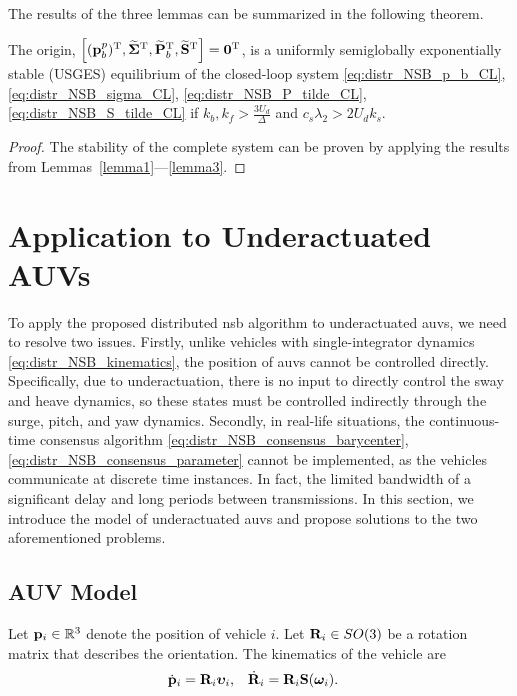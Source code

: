 The results of the three lemmas can be summarized in the following theorem.
\begin{theorem}
    \label{thm_distr_NSB}
    The origin, $\left[(\mathbf{p}_b^p)^{\mathrm{T}}, \widetilde{\bm{\Sigma}}^{\mathrm{T}}, \widetilde{\mathbf{P}}_b^{\mathrm{T}}, \widetilde{\mathbf{S}}^{\mathrm{T}}\right] = \mathbf{0}^{\mathrm{T}}$, is a uniformly semiglobally exponentially stable (USGES) equilibrium of the closed-loop system \eqref{eq:distr_NSB_p_b_CL}, \eqref{eq:distr_NSB_sigma_CL}, \eqref{eq:distr_NSB_P_tilde_CL}, \eqref{eq:distr_NSB_S_tilde_CL} if $k_b, k_f > \frac{3U_d}{\Delta}$ and $c_s \lambda_2 > 2 U_d k_s$.
\end{theorem}
\begin{proof}
    The stability of the complete system can be proven by applying the results from Lemmas~\ref{lemma1}---\ref{lemma3}.
\end{proof}

\section{Application to Underactuated AUVs}
\label{sec:distr_NSB_AUV}
To apply the proposed distributed \gls{nsb} algorithm to underactuated \glspl{auv}, we need to resolve two issues.
Firstly, unlike vehicles with single-integrator dynamics \eqref{eq:distr_NSB_kinematics}, the position of \glspl{auv} cannot be controlled directly.
Specifically, due to underactuation, there is no input to directly control the sway and heave dynamics, so these states must be controlled indirectly through the surge, pitch, and yaw dynamics.
Secondly, in real-life situations, the continuous-time consensus algorithm \eqref{eq:distr_NSB_consensus_barycenter}, \eqref{eq:distr_NSB_consensus_parameter} cannot be implemented, as the vehicles communicate at discrete time instances.
In fact, the limited bandwidth of  a significant delay and long periods between transmissions.
In this section, we introduce the model of underactuated \glspl{auv} and propose solutions to the two aforementioned problems.

\subsection{AUV Model}
Let $\mathbf{p}_i \in \mathbb{R}^3$ denote the position of vehicle $i$.
Let $\mathbf{R}_i \in SO(3)$ be a rotation matrix that describes the orientation.
The kinematics of the vehicle are \cite{fossen_handbook_2011}
\begin{align}
    \dot{\mathbf{p}}_i &= \mathbf{R}_i \bm{\upsilon}_i, &
    \dot{\mathbf{R}}_i &= \mathbf{R}_i \mathbf{S}(\bm{\omega}_i).
    \label{eq:distr_NSB_AUV_kinematic}
\end{align}

